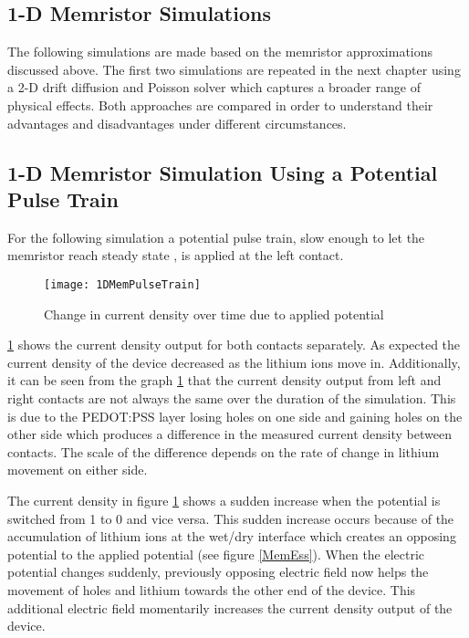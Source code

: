 \begin{doublespace}
\clearpage
\section{1-D Memristor Simulations}

The following simulations are made based on the memristor approximations discussed above. The first two simulations are repeated in the next chapter using a 2-D drift diffusion and Poisson solver which captures a broader range of physical effects. Both approaches are compared in order to understand their advantages and disadvantages under different circumstances.

\subsection{1-D Memristor Simulation Using a Potential Pulse Train}
  
For the following simulation a potential pulse train, slow enough to let the memristor reach steady state , is applied at the left contact.
\begin{figure}[!htp]
\centering
\texttt{[image: 1DMemPulseTrain]}
\caption{Change in current density over time due to applied potential} 
\label{MemResTrain}
\end{figure}
 \ref{MemResTrain} shows the current density output for both contacts separately. As expected the current density of the device decreased as the lithium ions move in. Additionally, it can be seen from the graph \ref{MemResTrain} that the current density output from left and right contacts are not always the same over the duration of the simulation. This is due to the PEDOT:PSS layer losing holes on one side and gaining holes on the other side which produces a difference in the measured current density between contacts. The scale of the difference depends on the rate of change in lithium movement on either side.

The current density in figure \ref{MemResTrain} shows a sudden increase when the potential is switched from 1 to 0 and vice versa. This sudden increase occurs because of the accumulation of lithium ions at the wet/dry interface which creates an opposing potential to the applied potential (see figure \ref{MemEss}). When the electric potential changes suddenly,  previously opposing electric field now helps the movement of holes and lithium towards the other end of the device. This additional electric field momentarily increases the current density output of the device.


\end{doublespace}
